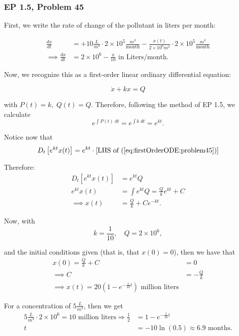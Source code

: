 \documentclass{article}
\begin{document}
\subsubsection{EP 1.5, Problem 45}

First, we write the rate of change of the pollutant in liters per month:

\begin{align}
  \frac{dx}{dt} &= + 10 \frac{L}{m^{3}} \cdot 2 \times 10^5 \frac{m^3}{\mathrm{month}} - \frac{x(t)}{2 \times 10^6 m^3} \cdot 2 \times 10^5 \frac{m^3}{\mathrm{month}} \\
  \implies \frac{dx}{dt} &= 2 \times 10^6 - \frac{x}{10} \text{ in Liters/month.}
\end{align}

Now, we recognize this as a first-order linear ordinary differential equation:

\begin{equation}
\label{eq:firstOrderODE:problem45}
 \dot{x} + kx = Q
\end{equation}

with $P(t) = k, \; Q(t) = Q$. Therefore, following the method of EP 1.5, we calculate
\begin{equation}
\label{eq:5}
  e^{\int P(t) \; dt} = e^{\int k \;  dt} = e^{kt}.
\end{equation}

Notice now that
\begin{equation}
\label{eq:1}
  D_t \left[ e^{kt} x(t) \right] = e^{kt} \cdot \left[ \text{LHS of } (\ref{eq:firstOrderODE:problem45}) \right]
\end{equation}

Therefore:
\begin{align}
\label{eq:3}
  D_t \left[ e^{kt} x(t)  \right] &= e^{kt} Q \\
  e^{kt} x(t) &= \int e^{kt} Q = \frac{Q}{k}e^{kt} + C \\
  \implies x(t) &= \frac{Q}{k} + Ce^{-kt}.
\end{align}

Now, with
\begin{displaymath}
  k = \frac{1}{10}, \quad Q = 2 \times 10^6,
\end{displaymath}

and the initial conditions given (that is, that $x(0) = 0$), then we have that 
\begin{align}
\label{eq:6}
  x(0) = \frac{Q}{k} + C &= 0 \\
  \implies C &= - \frac{Q}{k} \\
  \implies x(t) = 20 (1 - e^{-\frac{1}{10} t}) \text{ million liters}
\end{align}

For a concentration of $5 \frac{L}{m^3}$, then we get 
\begin{align}
\label{eq:7}
  5 \frac{L}{m^3} \cdot 2 \times 10^6 = 10 \text{ million liters} \Rightarrow \frac{1}{2} &= 1 - e^{-\frac{1}{10}t} \\
  t &= - 10 \ln (0.5) \approx 6.9 \text{ months}.
\end{align}
\end{document}
